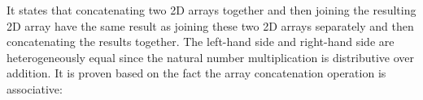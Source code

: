 \documentclass{l4proj}
\begin{document}
\begin{code}
\>[4]\AgdaSpace{}%
\AgdaOperator{\AgdaFunction{++}}\AgdaSpace{}%
\AgdaSpace{}%
\AgdaSymbol{(}\AgdaSpace{}%
\AgdaOperator{\AgdaFunction{++}}\AgdaSpace{}%
\AgdaSymbol{)}\<%
\\
%
\>[2]\AgdaSpace{}%
\AgdaSpace{}%
\AgdaSymbol{(}\AgdaSpace{}%
\AgdaSymbol{)}\AgdaSpace{}%
\AgdaSymbol{(}\AgdaSpace{}%
\AgdaSpace{}%
\AgdaSpace{}%
\AgdaSymbol{)}\AgdaSpace{}%
\AgdaSpace{}%
\AgdaSpace{}%
\AgdaSpace{}%
\AgdaSpace{}%
\AgdaOperator{\AgdaFunction{++}}\AgdaSpace{}%
\AgdaSymbol{)}\AgdaSpace{}%
\AgdaSymbol{(}\AgdaSpace{}%
\AgdaSpace{}%
\AgdaSymbol{)}\AgdaSpace{}%
\<%
\\
\>[2][@{}l@{\AgdaIndent{0}}]%
\>[4]\AgdaSpace{}%
\AgdaOperator{\AgdaFunction{++}}\AgdaSpace{}%
\AgdaSpace{}%
\AgdaSpace{}%
\AgdaOperator{\AgdaFunction{++}}\AgdaSpace{}%
\AgdaSpace{}%
\<%
\\
%
\>[2]\AgdaSpace{}%
\AgdaSpace{}%
\AgdaSymbol{(}\AgdaSpace{}%
\AgdaSpace{}%
\AgdaSymbol{(}\AgdaSpace{}%
\AgdaSymbol{)}\AgdaSpace{}%
\AgdaSymbol{(}\AgdaSpace{}%
\AgdaSymbol{))}\AgdaSpace{}%
\<%
\\
\>[2][@{}l@{\AgdaIndent{0}}]%
\>[4]\AgdaSymbol{(}\AgdaSpace{}%
\AgdaOperator{\AgdaFunction{++}}\AgdaSpace{}%
\AgdaSpace{}%
\AgdaSymbol{)}\AgdaSpace{}%
\AgdaOperator{\AgdaFunction{++}}\AgdaSpace{}%
\AgdaSpace{}%
\<%
\\
%
\>[2]\<%
\end{code}
It states that concatenating two 2D arrays together and then joining the resulting 2D array have the same result as joining these two 2D arrays separately and then concatenating the results together. The left-hand side and right-hand side are heterogeneously equal since the natural number multiplication is distributive over addition. It is proven based on the fact the array concatenation operation is associative:
\end{document}
